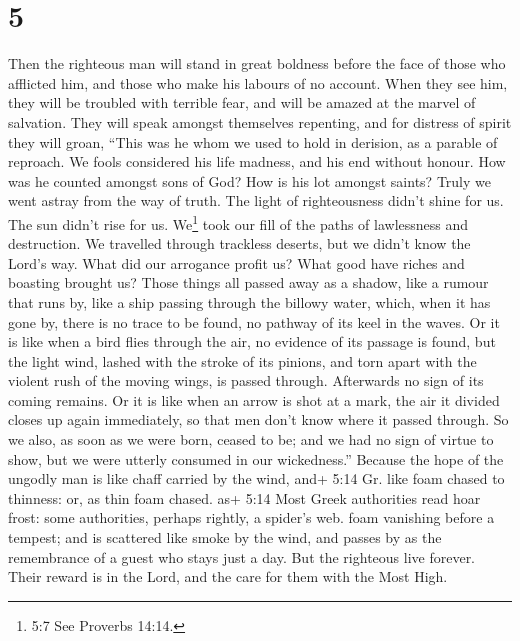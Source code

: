 \hypertarget{section-4}{%
\section{5}\label{section-4}}

 Then the righteous man will stand in great boldness before
the face of those who afflicted him, and those who make his labours of
no account.  When they see him, they will be troubled with
terrible fear, and will be amazed at the marvel of salvation.
 They will speak amongst themselves repenting, and for
distress of spirit they will groan, ``This was he whom we used to hold
in derision, as a parable of reproach.  We fools considered
his life madness, and his end without honour.  How was he
counted amongst sons of God? How is his lot amongst saints? 
Truly we went astray from the way of truth. The light of righteousness
didn't shine for us. The sun didn't rise for us. 
We\footnote{5:7 See Proverbs 14:14.} took our fill of the paths of
lawlessness and destruction. We travelled through trackless deserts, but
we didn't know the Lord's way.  What did our arrogance
profit us? What good have riches and boasting brought us? 
Those things all passed away as a shadow, like a rumour that runs by,
 like a ship passing through the billowy water, which, when
it has gone by, there is no trace to be found, no pathway of its keel in
the waves.  Or it is like when a bird flies through the
air, no evidence of its passage is found, but the light wind, lashed
with the stroke of its pinions, and torn apart with the violent rush of
the moving wings, is passed through. Afterwards no sign of its coming
remains.  Or it is like when an arrow is shot at a mark,
the air it divided closes up again immediately, so that men don't know
where it passed through.  So we also, as soon as we were
born, ceased to be; and we had no sign of virtue to show, but we were
utterly consumed in our wickedness.''  Because the hope of
the ungodly man is like chaff carried by the wind, and+ 5:14 Gr. like
foam chased to thinness: or, as thin foam chased. as+ 5:14 Most Greek
authorities read hoar frost: some authorities, perhaps rightly, a
spider's web. foam vanishing before a tempest; and is scattered like
smoke by the wind, and passes by as the remembrance of a guest who stays
just a day.  But the righteous live forever. Their reward
is in the Lord, and the care for them with the Most High. 
